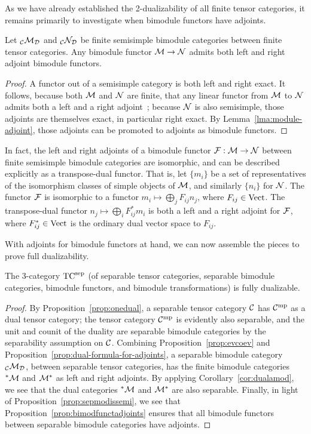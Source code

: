 \documentclass{amsart}
\begin{document}
As we have already established the 2-dualizability of all finite tensor categories, it remains primarily to investigate when bimodule functors have adjoints.
\begin{proposition} \label{prop:bimodfunctadjoints}
Let ${}_\mathcal C \mathcal M_\mathcal D$ and ${}_\mathcal C \mathcal N_\mathcal D$ be finite semisimple bimodule categories between finite tensor categories.  Any bimodule functor $\mathcal M \rightarrow \mathcal N$ admits both left and right adjoint bimodule functors.
\end{proposition}
\begin{proof}
A functor out of a semisimple category is both left and right exact.  It follows, because both $\mathcal M$ and $\mathcal N$ are finite, that any linear functor from $\mathcal M$ to $\mathcal N$ admits both a left and a right adjoint~\cite{BTP}; because $\mathcal N$ is also semisimple, those adjoints are themselves exact, in particular right exact.  By Lemma~\ref{lma:module-adjoint}, those adjoints can be promoted to adjoints as bimodule functors.
\end{proof}

\begin{remark}
In fact, the left and right adjoints of a bimodule functor $\mathcal F: \mathcal M \rightarrow \mathcal N$ between finite semisimple bimodule categories are isomorphic, and can be described explicitly as a transpose-dual functor.  That is, let $\{m_i\}$ be a set of representatives of the isomorphism classes of simple objects of $\mathcal M$, and similarly $\{n_i\}$ for $\mathcal N$.  The functor $\mathcal F$ is isomorphic to a functor $m_i \mapsto \bigoplus_j F_{ij} n_j$, where $F_{ij} \in \mathrm{Vect}$.  The transpose-dual functor $n_j \mapsto \bigoplus_i F_{ij}^* m_i$ is both a left and a right adjoint for $\mathcal F$, where $F_{ij}^* \in \mathrm{Vect}$ is the ordinary dual vector space to $F_{ij}$.
\end{remark}

With adjoints for bimodule functors at hand, we can now assemble the pieces to prove full dualizability.
\begin{theorem} \label{thm:TC-dualizable}
The 3-category ${\mathrm{TC}^{\mathrm{sep}}}$ (of separable tensor categories, separable bimodule categories, bimodule functors, and bimodule transformations) is fully dualizable.
\end{theorem}
\begin{proof}
By Proposition~\ref{prop:onedual}, a separable tensor category $\mathcal C$ has $\mathcal C^{\mathrm{mp}}$ as a dual tensor category; the tensor category $\mathcal C^{\mathrm{mp}}$ is evidently also separable, and the unit and counit of the duality are separable bimodule categories by the separability assumption on $\mathcal C$.  Combining Proposition~\ref{prop:evcoev} and Proposition~\ref{prop:dual-formula-for-adjoints}, a separable bimodule category ${}_\mathcal C \mathcal M_\mathcal D$, between separable tensor categories, has the finite bimodule categories ${}^* \mathcal M$ and $\mathcal M^*$ as left and right adjoints.  By applying Corollary~\ref{cor:dualamod}, we see that the dual categories ${}^* \mathcal M$ and $\mathcal M^*$ are also separable.  Finally, in light of Proposition~\ref{prop:sepmodissemi}, we see that Proposition~\ref{prop:bimodfunctadjoints} ensures that all bimodule functors between separable bimodule categories have adjoints.
\end{proof}
\end{document}
